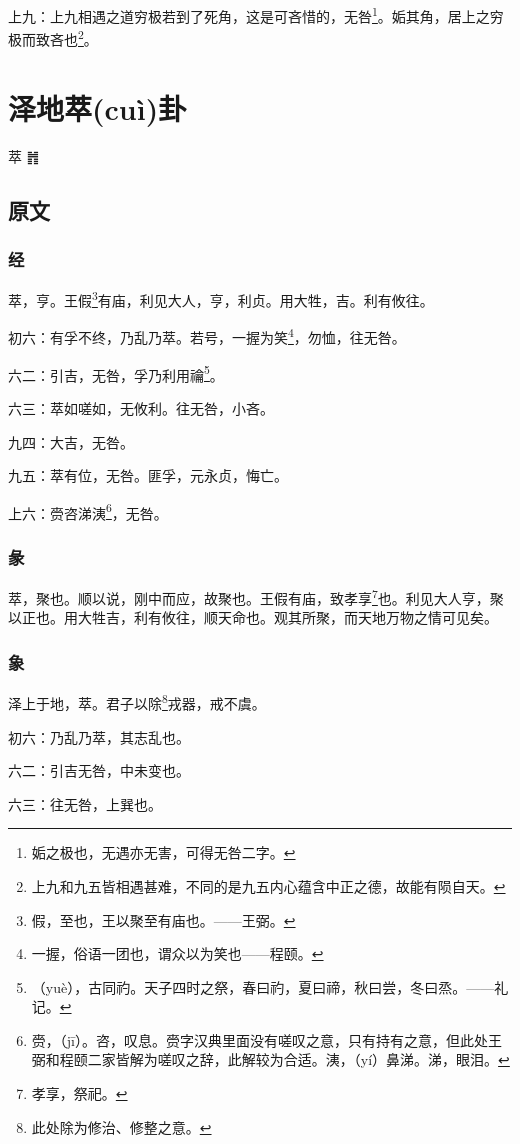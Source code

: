 \documentclass[12pt,oneside]{book}
\begin{document}
上九：上九相遇之道穷极若到了死角，这是可吝惜的，无咎\footnote{姤之极也，无遇亦无害，可得无咎二字。}。姤其角，居上之穷极而致吝也\footnote{上九和九五皆相遇甚难，不同的是九五内心蕴含中正之德，故能有陨自天。}。



\chapter{泽地萃(cuì)卦}
萃 {\Large ䷬}
\section{原文}

\subsection{经}
萃，亨。王假\footnote{假，至也，王以聚至有庙也。——王弼。}有庙，利见大人，亨，利贞。用大牲，吉。利有攸往。

初六：有孚不终，乃乱乃萃。若号，一握为笑\footnote{一握，俗语一团也，谓众以为笑也——程颐。}，勿恤，往无咎。

六二：引吉，无咎，孚乃利用禴\footnote{（yuè），古同礿。天子四时之祭，春曰礿，夏曰禘，秋曰尝，冬曰烝。——礼记。}。

六三：萃如嗟如，无攸利。往无咎，小吝。

九四：大吉，无咎。

九五：萃有位，无咎。匪孚，元永贞，悔亡。

上六：赍咨涕洟\footnote{赍，（jī）。咨，叹息。赍字汉典里面没有嗟叹之意，只有持有之意，但此处王弼和程颐二家皆解为嗟叹之辞，此解较为合适。洟，（yí）鼻涕。涕，眼泪。}，无咎。

\subsection{彖}
萃，聚也。顺以说，刚中而应，故聚也。王假有庙，致孝享\footnote{孝享，祭祀。}也。利见大人亨，聚以正也。用大牲吉，利有攸往，顺天命也。观其所聚，而天地万物之情可见矣。

\subsection{象}
泽上于地，萃。君子以除\footnote{此处除为修治、修整之意。}戎器，戒不虞。

初六：乃乱乃萃，其志乱也。

六二：引吉无咎，中未变也。

六三：往无咎，上巽也。
\end{document}
